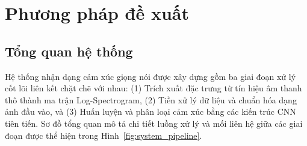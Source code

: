 \chapter{Phương pháp đề xuất}
\label{chap:methodology}

\section{Tổng quan hệ thống}
\label{sec:system_overview}

Hệ thống nhận dạng cảm xúc giọng nói được xây dựng gồm ba giai đoạn xử lý cốt lõi liên kết chặt chẽ với nhau: (1) Trích xuất đặc trưng từ tín hiệu âm thanh thô thành ma trận Log-Spectrogram, (2) Tiền xử lý dữ liệu và chuẩn hóa dạng ảnh đầu vào, và (3) Huấn luyện và phân loại cảm xúc bằng các kiến trúc CNN tiên tiến. Sơ đồ tổng quan mô tả chi tiết luồng xử lý và mối liên hệ giữa các giai đoạn được thể hiện trong Hình~\ref{fig:system_pipeline}.

